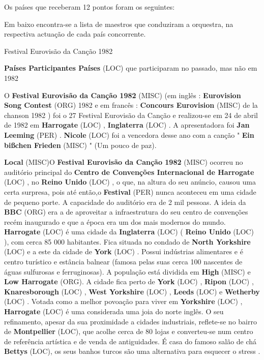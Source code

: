 \documentclass[12pt,a4paper]{article}
\begin{document}
Os países que receberam 12 pontos foram os seguintes:

Em baixo encontra-se a lista de maestros que conduziram a orquestra, na respectiva actuação de cada país concorrente.



Festival Eurovisão da Canção 1982



\textbf{Países Participantes Países} (LOC) que participaram no passado, mas não em 1982

O \textbf{Festival Eurovisão da Canção 1982} (MISC) (em inglês : \textbf{Eurovision Song Contest} (ORG) 1982 e em francês : \textbf{Concours Eurovision} (MISC) de la chanson 1982 ) foi o 27 Festival Eurovisão da Canção e realizou-se em 24 de abril de 1982 em \textbf{Harrogate} (LOC) , \textbf{Inglaterra} (LOC) . A apresentadora foi \textbf{Jan Leeming} (PER) . \textbf{Nicole} (LOC) foi a vencedora desse ano com a canção " \textbf{Ein bißchen Frieden} (MISC) " (Um pouco de paz).



\textbf{Local} (MISC)O \textbf{Festival Eurovisão da Canção 1982} (MISC) ocorreu no auditório principal do \textbf{Centro de Convenções Internacional de Harrogate} (LOC) , no \textbf{Reino Unido} (LOC) , o que, na altura do seu anúncio, causou uma certa surpresa, pois até então,o \textbf{Festival} (PER) nunca aconteceu em uma cidade de pequeno porte. A capacidade do auditório era de 2 mil pessoas. A ideia da \textbf{BBC} (ORG) era a de aproveitar a infraestrutura do seu centro de convenções recém inaugurado e que a época era um dos mais modernos do mundo. \textbf{Harrogate} (LOC) é uma cidade da \textbf{Inglaterra} (LOC) ( \textbf{Reino Unido} (LOC) ), com cerca 85 000 habitantes. Fica situada no condado de \textbf{North Yorkshire} (LOC) e a este da cidade de \textbf{York} (LOC) . Possui indústrias alimentares e é centro turístico e estância balnear (famosa pelas suas cerca 100 nascentes de águas sulfurosas e ferruginosas). A população está dividida em \textbf{High} (MISC) e \textbf{Low Harrogate} (ORG). A cidade fica perto de \textbf{York} (LOC) , \textbf{Ripon} (LOC) , \textbf{Knaresborough} (LOC) , \textbf{West Yorkshire} (LOC) , \textbf{Leeds} (LOC) e \textbf{Wetherby} (LOC) . Votada como a melhor povoação para viver em \textbf{Yorkshire} (LOC) , \textbf{Harrogate} (LOC) é uma considerada uma joia do norte inglês. O seu refinamento, apesar da sua proximidade a cidades industriais, reflete-se no bairro de \textbf{Montpellier} (LOC), que acolhe cerca de 80 lojas e converteu-se num centro de referência artística e de venda de antiguidades. É casa do famoso salão de chá \textbf{Bettys} (LOC), os seus banhos turcos são uma alternativa para esquecer o stress .
\end{document}
